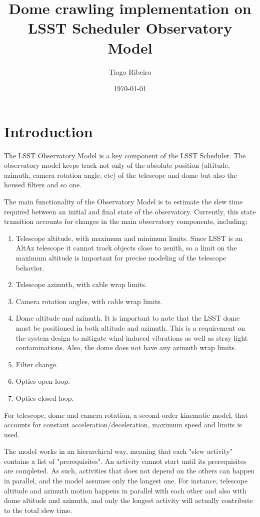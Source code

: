 \documentclass[TS,lsstdraft,toc,usenatbib]{lsstdoc}
\title[Dome crawling implementation]{Dome crawling implementation on LSST Scheduler Observatory Model}
\author{Tiago Ribeiro}
\date{\today}
\begin{document}
\maketitle


\section{Introduction} 
\label{sec:intro}


The LSST Observatory Model is a key component of the LSST Scheduler. The observatory model keeps track not only of the absolute position (altitude, azimuth, camera rotation angle, etc) of the telescope and dome but also the housed filters and so one. 

The main functionality of the Observatory Model is to estimate the slew time required between an initial and final state of the observatory. Currently, this state transition accounts for changes in the main observatory components, including; 
%
\begin{enumerate}
\item Telescope altitude, with maximum and minimum limits. Since LSST is an AltAz telescope it cannot track objects close to zenith, so a limit on the maximum altitude is important for precise modeling of the telescope behavior. 
\item Telescope azimuth, with cable wrap limits. 
\item Camera rotation angles, with cable wrap limits. 
\item Dome altitude and azimuth. It is important to note that the LSST dome must be positioned in both altitude and azimuth. This is a requirement on the system design to mitigate wind-induced vibrations as well as stray light contaminations. Also, the dome does not have any azimuth wrap limits. 
\item Filter change. 
\item Optics open loop.
\item Optics closed loop.
\end{enumerate}
%
For telescope, dome and camera rotation, a second-order kinematic model, that accounts for constant acceleration/deceleration, maximum speed and limits is used.

The model works in an hierarchical way, meaning that each "slew activity" contains a list of "prerequisites". An activity cannot start until its prerequisites are completed. As such, activities that does not depend on the others can happen in parallel, and the model assumes only the longest one. For instance, telescope altitude and azimuth motion happens in parallel with each other and also with dome altitude and azimuth, and only the longest activity will actually contribute to the total slew time.
\end{document}
